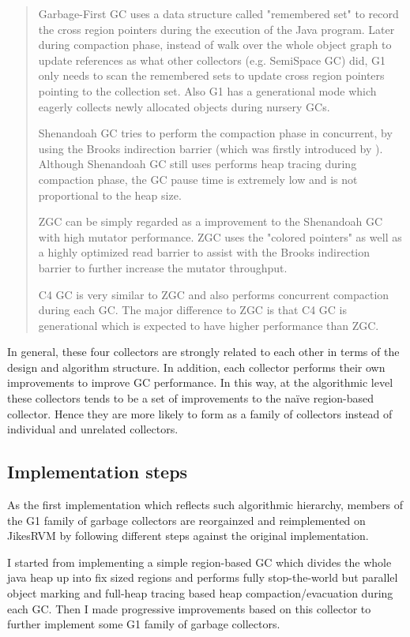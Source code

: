 \begin{quote}
  Garbage-First GC uses a data structure called "remembered set" to record the
  cross region pointers during the execution of the Java program.
  Later during compaction phase, instead of walk over the whole object graph to update
  references as what other collectors (e.g. SemiSpace GC) did, G1 only needs to scan the
  remembered sets to update cross region pointers pointing to the collection set.
  Also G1 has a generational mode which eagerly collects newly allocated objects
  during nursery GCs.

  Shenandoah GC tries to perform the compaction phase in concurrent, by using the
  Brooks indirection barrier (which was firstly introduced by \cite{brooks1984trading}).
  Although Shenandoah GC still uses performs heap tracing during compaction phase,
  the GC pause time is extremely low and is not proportional to the heap size.

  ZGC can be simply regarded as a improvement to the Shenandoah GC with high mutator performance.
  ZGC uses the "colored pointers"
  as well as a highly optimized read barrier to assist with the Brooks indirection barrier
  to further increase the mutator throughput.

  C4 GC is very similar to ZGC and also performs concurrent compaction during each
  GC. The major difference to ZGC is that C4 GC is generational which is expected
  to have higher performance than ZGC.
\end{quote}

In general, these four collectors are strongly related to each other in terms of
the design and algorithm structure. In addition, each collector performs their
own improvements to improve GC performance. In this way, at the algorithmic level
these collectors tends to be a set of improvements to the naïve region-based collector.
Hence they are more likely to form as a family of collectors
instead of individual and unrelated collectors.

\subsection{Implementation steps}

As the first implementation which reflects such algorithmic hierarchy,
members of the G1 family of garbage collectors are reorgainzed and reimplemented on JikesRVM
by following different steps against the original implementation. 

I started from implementing a simple region-based GC which divides the whole java heap
up into fix sized regions and performs fully stop-the-world but parallel object marking
and full-heap tracing based heap compaction/evacuation during each GC.
Then I made progressive improvements based on this collector to further implement some G1 family of garbage collectors.

